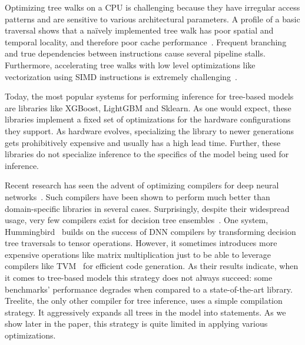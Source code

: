 Optimizing tree walks on a CPU is challenging because they have irregular access
patterns and are sensitive to various architectural parameters.  A profile of a
basic traversal shows that a na\"ively implemented tree walk has poor spatial
and temporal locality, and therefore poor cache performance~\cite{FAST,MilindTreeVectorization}.  Frequent branching and true dependencies
between instructions cause several pipeline stalls. Furthermore, accelerating tree
walks with low level optimizations like vectorization using SIMD instructions is
extremely challenging~\cite{MilindTreeVectorization}.

Today, the most popular systems for performing inference for tree-based models
are libraries like XGBoost\cite{XGBoost}, LightGBM\cite{LightGBM} and
Sklearn\cite{Sklearn}.  As one would expect, these libraries implement a fixed
set of optimizations for the hardware configurations they support. As hardware
evolves, specializing the library to newer generations gets prohibitively
expensive and usually has a high lead time. Further, these libraries do not
specialize inference to the specifics of the model being used for inference.

Recent research has seen the advent of optimizing compilers for deep neural
networks~\cite{Halide, TVM, TensorComprehensions, Tiramisu, XLA}. Such compilers
have been shown to perform much better than domain-specific libraries in several
cases.  Surprisingly, despite their widespread usage, very few compilers exist
for decision tree ensembles~\cite{Treelite, Hummingbird}.  One 
system, Hummingbird~\cite{Hummingbird} builds on the success of DNN compilers by
transforming decision tree traversals to tensor operations. However, it sometimes
introduces more expensive operations like matrix multiplication
just to be able to leverage compilers
like TVM~\cite{TVM} for efficient code generation. As their results indicate,
when it comes to tree-based models this strategy does not always succeed: some
benchmarks' performance degrades when compared to a state-of-the-art library. 
Treelite\cite{Treelite}, the only other compiler for tree inference, uses 
a simple compilation strategy. It aggressively expands all trees in the 
model into  statements. As we show later in the paper, this strategy
is quite limited in applying various optimizations.

